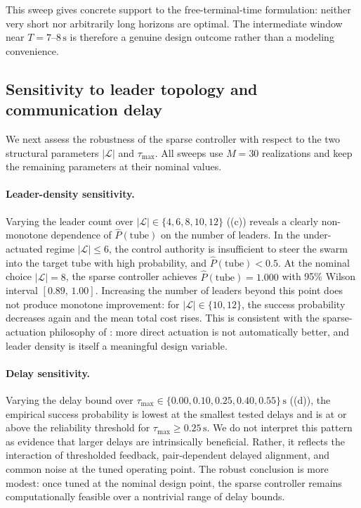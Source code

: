 \documentclass[pdflatex,sn-mathphys-num]{sn-jnl}%
\numberwithin{equation}{section}
\theoremstyle{thmstyleone}%
\theoremstyle{remark}
\theoremstyle{definition}
\newcommand{\calL}{\mathcal{L}}
\begin{document}
This sweep gives concrete support to the free-terminal-time formulation:
neither very short nor arbitrarily long horizons are optimal. The
intermediate window near $T=7$--$8\,\mathrm{s}$ is therefore a genuine
design outcome rather than a modeling convenience.

\subsection{Sensitivity to leader topology and communication delay}
\label{subsec:num-sensitivity}

We next assess the robustness of the sparse controller with respect to the
two structural parameters $|\calL|$ and $\tau_{\max}$. All sweeps use
$M=30$ realizations and keep the remaining parameters at their nominal
values.

\paragraph{Leader-density sensitivity.}
Varying the leader count over $|\calL|\in\{4,6,8,10,12\}$
((c)) reveals a clearly non-monotone dependence
of $\hat P(\mathrm{tube})$ on the number of leaders. In the under-actuated
regime $|\calL|\le 6$, the control authority is insufficient to steer the
swarm into the target tube with high probability, and
$\hat P(\mathrm{tube})<0.5$. At the nominal choice $|\calL|=8$, the sparse
controller achieves $\hat P(\mathrm{tube})=1.000$ with 95\% Wilson interval
$[0.89,\,1.00]$. Increasing the number of leaders beyond this point does
not produce monotone improvement: for $|\calL|\in\{10,12\}$, the success
probability decreases again and the mean total cost rises. This is
consistent with the sparse-actuation philosophy of
\cite{caponigro2013sparse,caponigro2015sparse}: more direct actuation is not
automatically better, and leader density is itself a meaningful design
variable.

\paragraph{Delay sensitivity.}
Varying the delay bound over
$\tau_{\max}\in\{0.00,0.10,0.25,0.40,0.55\}\,\mathrm{s}$
((d)), the empirical success probability is
lowest at the smallest tested delays and is at or above the reliability
threshold for $\tau_{\max}\ge 0.25\,\mathrm{s}$. We do not interpret
this pattern as evidence that larger delays are intrinsically beneficial.
Rather, it reflects the interaction of thresholded feedback, pair-dependent
delayed alignment, and common noise at the tuned operating point. The
robust conclusion is more modest: once tuned at the nominal design point,
the sparse controller remains computationally feasible over a nontrivial
range of delay bounds.
\end{document}
